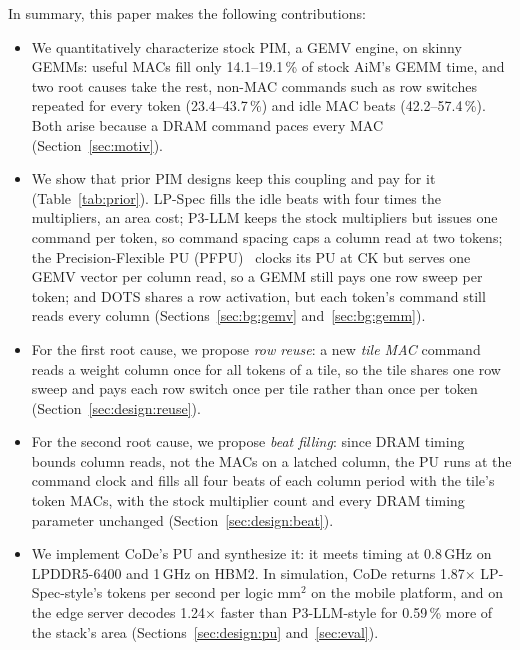 In summary, this paper makes the following contributions:
\begin{itemize}
  \item We quantitatively characterize stock PIM, a GEMV engine, on skinny GEMMs: useful MACs fill only
        14.1--19.1\,\% of stock AiM's GEMM time, and two root causes take the rest, non-MAC commands such as row
        switches repeated for every token (23.4--43.7\,\%) and idle MAC beats (42.2--57.4\,\%). Both arise because a
        DRAM command paces every MAC (Section~\ref{sec:motiv}).
  \item We show that prior PIM designs keep this coupling and pay for it (Table~\ref{tab:prior}). LP-Spec fills the
        idle beats with four times the multipliers, an area cost; P3-LLM keeps the stock multipliers but issues one
        command per token, so command spacing caps a column read at two tokens; the Precision-Flexible PU
        (PFPU)~\cite{pfpu} clocks its PU at CK but serves one GEMV vector per column read, so a GEMM still pays one row
        sweep per token; and DOTS shares a row activation, but each token's command still reads every column
        (Sections~\ref{sec:bg:gemv} and~\ref{sec:bg:gemm}).
  \item For the first root cause, we propose \emph{row reuse}: a new \emph{tile MAC} command reads a weight column
        once for all tokens of a tile, so the tile shares one row sweep and pays each row switch once per tile rather
        than once per token (Section~\ref{sec:design:reuse}).
  \item For the second root cause, we propose \emph{beat filling}: since DRAM timing bounds column reads, not the MACs
        on a latched column, the PU runs at the command clock and fills all four beats of each column period with the
        tile's token MACs, with the stock multiplier count and every DRAM timing parameter unchanged
        (Section~\ref{sec:design:beat}).
  \item We implement CoDe's PU and synthesize it: it meets timing at 0.8\,GHz on LPDDR5-6400 and 1\,GHz on HBM2. In
        simulation, CoDe returns 1.87$\times$ LP-Spec-style's tokens per second per logic mm$^2$ on the mobile platform,
        and on the edge server decodes 1.24$\times$ faster than P3-LLM-style for 0.59\,\% more of the stack's area
        (Sections~\ref{sec:design:pu} and~\ref{sec:eval}).
\end{itemize}

